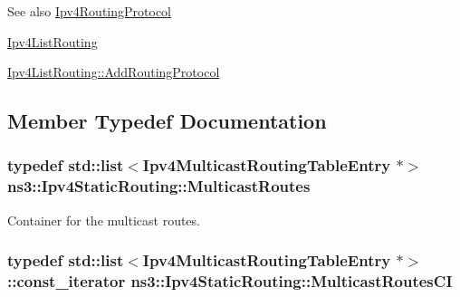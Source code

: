 \begin{DoxySeeAlso}{See also}
\hyperlink{classns3_1_1Ipv4RoutingProtocol}{Ipv4\+Routing\+Protocol} 

\hyperlink{classns3_1_1Ipv4ListRouting}{Ipv4\+List\+Routing} 

\hyperlink{classns3_1_1Ipv4ListRouting_aac3d4da5db389114e7b980c6136f11a2}{Ipv4\+List\+Routing\+::\+Add\+Routing\+Protocol} 
\end{DoxySeeAlso}


\subsection{Member Typedef Documentation}
\subsubsection[{\texorpdfstring{Multicast\+Routes}{MulticastRoutes}}]{\setlength{\rightskip}{0pt plus 5cm}typedef {\bf std\+::list}$<${\bf Ipv4\+Multicast\+Routing\+Table\+Entry} $\ast$$>$ {\bf ns3\+::\+Ipv4\+Static\+Routing\+::\+Multicast\+Routes}\hspace{0.3cm}{\ttfamily [private]}}\hypertarget{classns3_1_1Ipv4StaticRouting_a8ed35ab38cf9627ef4f80b06d3ce6531}{}\label{classns3_1_1Ipv4StaticRouting_a8ed35ab38cf9627ef4f80b06d3ce6531}


Container for the multicast routes. 

\subsubsection[{\texorpdfstring{Multicast\+Routes\+CI}{MulticastRoutesCI}}]{\setlength{\rightskip}{0pt plus 5cm}typedef {\bf std\+::list}$<${\bf Ipv4\+Multicast\+Routing\+Table\+Entry} $\ast$$>$\+::const\+\_\+iterator {\bf ns3\+::\+Ipv4\+Static\+Routing\+::\+Multicast\+Routes\+CI}\hspace{0.3cm}{\ttfamily [private]}}\hypertarget{classns3_1_1Ipv4StaticRouting_a8edf8cf21421add8ab26b5120797f21f}{}\label{classns3_1_1Ipv4StaticRouting_a8edf8cf21421add8ab26b5120797f21f}



